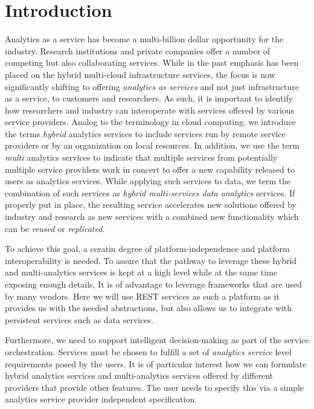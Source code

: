 
\section{Introduction}
\label{sec:summary}


Analytics as a service has become a multi-billion dollar opportunity
for the industry. Research institutions and private companies offer a
number of competing but also collaborating services. While in the past
emphasis has been placed on the hybrid multi-cloud infrastructure
services, the focus is now significantly shifting to offering {\em
analytics as services} and not just infrastructure as a service, to
customers and researchers. As such, it is important to identify how
researchers and industry can interoperate with services offered by
various service providers. Analog to the terminology in cloud
computing, we introduce the terms {\em hybrid} analytics services to
include services run by remote service providers or by an organization
on local resources.  In addition, we use the term {\em multi}
analytics services to indicate that multiple services from potentially
multiple service providers work in concert to offer a new capability
released to users as analytics services. While applying such services
to data, we term the combination of such services as {\em hybrid
multi-services data analytics} services. If properly put in place, the
resulting service accelerates new solutions offered by industry and
research as new services with a combined new functionality which can
be {\em reused} or {\em replicated}.

To achieve this goal, a ceratin degree of platform-independence and
platform interoperability is needed.  To assure that the pathway to
leverage these hybrid and multi-analytics services is kept at a high
level while at the same time exposing enough details, It is of
advantage to leverage frameworks that are used by many vendors. Here
we will use REST services as such a platform as it provides us with
the needed abstractions, but also allows us to integrate with
persistent services such as data services.

Furthermore, we need to support intelligent decision-making as part of
the service orchestration. Services must be chosen to fulfill a set of
{\em analytics service} level requirements posed by the users. It is
of particular interest how we can formulate hybrid analytics services
and multi-analytics services offered by different providers that
provide other features. The user needs to specify this via a simple
analytics service provider independent specification.

